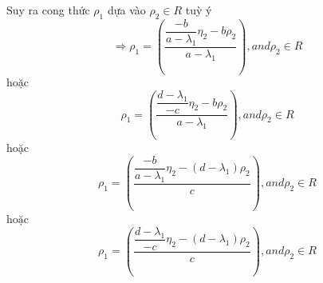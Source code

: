 \documentclass[a4paper]{article}
\begin{document}
    Suy ra cong thức $\rho_1$ dựa vào $\rho_2 \in R$ tuỳ ý
    \begin{equation}
        \Rightarrow
        \rho_1
            = (\dfrac{\dfrac{-b}{a - \lambda_1}\eta_2 - b \rho_2}{a - \lambda_1})
            , and \rho_2 \in R\label{eq:equation7}
    \end{equation}
    hoặc
    \begin{equation}
        \rho_1
            = (\dfrac{\dfrac{d - \lambda_1}{-c}\eta_2 -b \rho_2}{a - \lambda_1})
            , and \rho_2 \in R\label{eq:equation10}
    \end{equation}
    hoặc
    \begin{equation}
        \rho_1
            = (\dfrac{\dfrac{-b}{a - \lambda_1}\eta_2 -(d - \lambda_1) \rho_2}{c})
            , and \rho_2 \in R\label{eq:equation11}
    \end{equation}
    hoặc
    \begin{equation}
        \rho_1
            = (\dfrac{\dfrac{d - \lambda_1}{-c}\eta_2 -(d - \lambda_1) \rho_2}{c})
            , and \rho_2 \in R\label{eq:equation12}
    \end{equation}
\end{document}

